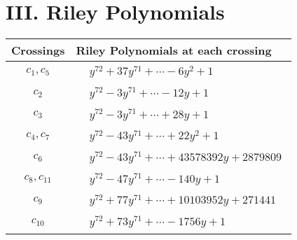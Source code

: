 \documentclass[1p]{elsarticle_modified}
\theoremstyle{definition}
\begin{document}
\centering \section*{ III. Riley Polynomials}
\begin{tabular}{m{50pt}|m{274pt}}
Crossings & \hspace{64pt}Riley Polynomials at each crossing \\
\hline $$\begin{aligned}c_{1},c_{5}\end{aligned}$$&$\begin{aligned}
&y^{72}+37 y^{71}+\cdots-6 y^2+1
\end{aligned}$\\
\hline $$\begin{aligned}c_{2}\end{aligned}$$&$\begin{aligned}
&y^{72}-3 y^{71}+\cdots-12 y+1
\end{aligned}$\\
\hline $$\begin{aligned}c_{3}\end{aligned}$$&$\begin{aligned}
&y^{72}-3 y^{71}+\cdots+28 y+1
\end{aligned}$\\
\hline $$\begin{aligned}c_{4},c_{7}\end{aligned}$$&$\begin{aligned}
&y^{72}-43 y^{71}+\cdots+22 y^2+1
\end{aligned}$\\
\hline $$\begin{aligned}c_{6}\end{aligned}$$&$\begin{aligned}
&y^{72}-43 y^{71}+\cdots+43578392 y+2879809
\end{aligned}$\\
\hline $$\begin{aligned}c_{8},c_{11}\end{aligned}$$&$\begin{aligned}
&y^{72}-47 y^{71}+\cdots-140 y+1
\end{aligned}$\\
\hline $$\begin{aligned}c_{9}\end{aligned}$$&$\begin{aligned}
&y^{72}+77 y^{71}+\cdots+10103952 y+271441
\end{aligned}$\\
\hline $$\begin{aligned}c_{10}\end{aligned}$$&$\begin{aligned}
&y^{72}+73 y^{71}+\cdots-1756 y+1
\end{aligned}$\\
\hline
\end{tabular}
\vskip 2pc
\end{document}
